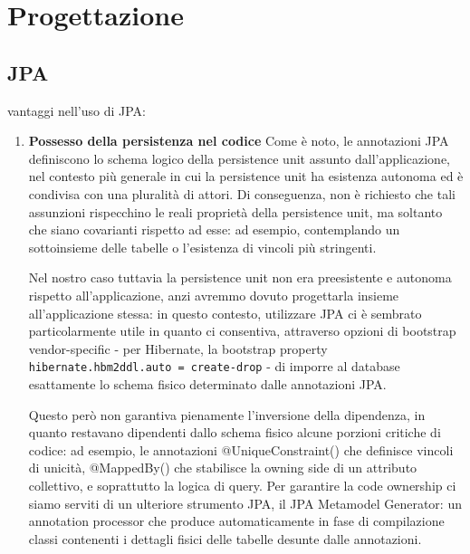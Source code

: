 \section{Progettazione}

\subsection{JPA}
vantaggi nell'uso di JPA:
\begin{enumerate}
    \item \textbf{Possesso della persistenza nel codice} \newline
          Come è noto, le annotazioni JPA definiscono lo schema logico della persistence unit
          assunto dall'applicazione, nel contesto più generale in cui la persistence unit ha
          esistenza autonoma ed è condivisa con una pluralità di attori.
          Di conseguenza, non è richiesto che tali assunzioni rispecchino le reali proprietà
          della persistence unit, ma soltanto che siano covarianti rispetto ad esse:
          ad esempio, contemplando un sottoinsieme delle tabelle o l'esistenza di vincoli più stringenti.

          Nel nostro caso tuttavia la persistence unit non era preesistente e autonoma
          rispetto all'applicazione, anzi avremmo dovuto progettarla insieme all'applicazione stessa:
          in questo contesto, utilizzare JPA ci è sembrato particolarmente utile in quanto ci consentiva,
          attraverso opzioni di bootstrap vendor-specific - per Hibernate, la bootstrap property
          \texttt{hibernate.hbm2ddl.auto = create-drop} - di imporre al database esattamente
          lo schema fisico determinato dalle annotazioni JPA.

          Questo però non garantiva pienamente l'inversione della dipendenza, in quanto
          restavano dipendenti dallo schema fisico alcune porzioni critiche di codice: ad esempio,
          le annotazioni @UniqueConstraint() che definisce vincoli di unicità, @MappedBy() che stabilisce
          la owning side di un attributo collettivo, e soprattutto la logica di query.
          Per garantire la code ownership ci siamo serviti di un ulteriore strumento JPA,
          il JPA Metamodel Generator: un annotation processor che produce automaticamente
          in fase di compilazione classi contenenti i dettagli fisici delle tabelle desunte
          dalle annotazioni.


\end{enumerate}
